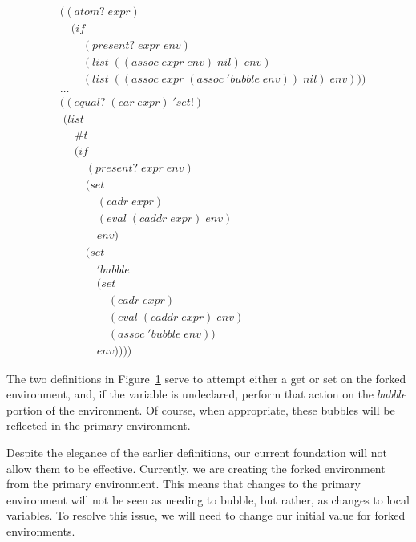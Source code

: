 \begin{figure}[htp]
\footnotesize
\caption{}\label{fig:scopeReflectionTweaks}
\begin{align*}
& ((atom? \; expr) \; 
\\& \quad (if
\\& \qquad (present? \; expr \; env)
\\& \qquad (list \; ((assoc \; expr \; env) \; nil) \; env)
\\& \qquad (list \; ((assoc \; expr \; (assoc \; 'bubble \; env)) \; nil) \; env)))
\\& \dots \; 
\\& ((equal? \; (car \; expr) \; 'set!)
\\& \; (list \; 
\\& \quad \; \#t \; 
\\& \quad \; (if
\\& \qquad \; (present? \; expr \; env)
\\& \qquad \; (set \; 
\\& \qquad \quad \; (cadr \; expr) \; 
\\& \qquad \quad \; (eval \; (caddr \; expr) \; env) \; 
\\& \qquad \quad \; env)
\\& \qquad \; (set
\\& \qquad \quad \; 'bubble
\\& \qquad \quad \; (set
\\& \qquad \qquad \; (cadr \; expr)
\\& \qquad \qquad \; (eval \; (caddr \; expr) \; env)
\\& \qquad \qquad \; (assoc \; 'bubble \; env))
\\& \qquad \quad \; env)))) \; 
\end{align*}
\end{figure}

The two definitions in Figure~\ref{fig:scopeReflectionTweaks} serve to attempt
either a get or set on the forked environment, and, if the variable is
undeclared, perform that action on the $bubble$ portion of the environment. Of
course, when appropriate, these bubbles will be reflected in the primary
environment.

Despite the elegance of the earlier definitions, our current foundation will
not allow them to be effective. Currently, we are creating the forked
environment from the primary environment. This means that changes to the
primary environment will not be seen as needing to bubble, but rather, as 
changes to local variables. To resolve this issue, we will need to change our
initial value for forked environments.

